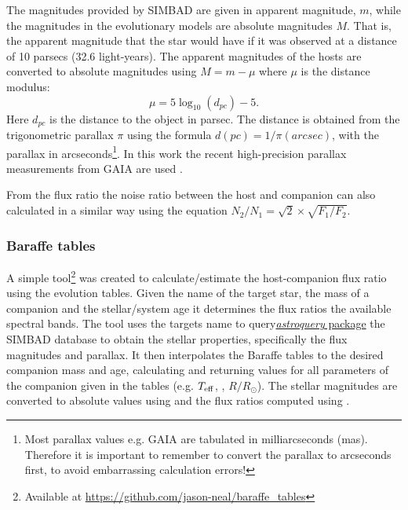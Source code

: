 The magnitudes provided by {SIMBAD} are given in apparent magnitude, $m$, while the magnitudes in the evolutionary models are absolute magnitudes $M$. That is, the apparent magnitude that the star would have if it was observed at a distance of 10 parsecs (32.6 light-years). The apparent magnitudes of the hosts are converted to absolute magnitudes using \(M = m - \mu\) where \(\mu\) is the distance modulus:
\begin{equation}
\mu = 5 \log_{10}(d_{pc}) -5. \label{eqn:distance_modulus}
\end{equation}
Here $d_{pc}$ is the distance to the object in parsec. The distance is obtained from the trigonometric parallax  $\pi$ using the formula $d(pc) = 1 /\pi(arcsec)$, with the parallax in arcseconds\footnote{Most parallax values e.g. GAIA are tabulated in milliarcseconds (mas). Therefore it is important to remember to convert the parallax to arcseconds first, to avoid embarrassing calculation errors!}. In this work the recent high-precision parallax measurements from GAIA are used  \citet{collaboration_gaia_2018}.

From the flux ratio the noise ratio between the host and companion can also calculated in a similar way using the equation \(N_{2}/N_{1} = \sqrt{2} \times\sqrt{F_{1}/F_{2}}\).


\subsubsection{Baraffe tables}
\label{subsubsec:baraffe_tables_code}
A simple tool\footnote{Available at \url{https://github.com/jason-neal/baraffe_tables}} was created to calculate/estimate the host-companion flux ratio using the \citet{baraffe_evolutionary_2003,baraffe_new_2015} evolution tables.
Given the name of the target star, the mass of a companion and the stellar/system age it determines the flux ratios the available spectral bands.
The tool uses the targets name  to query\href{https://zenodo.org/record/1160627}{\emph{astroquery} package} the {SIMBAD} database to obtain the stellar properties, specifically the flux magnitudes and parallax. It then interpolates the Baraffe tables to the desired companion mass and age, calculating and returning values for all parameters of the companion given in the tables (e.g. \(T_{\mathrm{eff}}\), \logg, \(R/R_{\odot}\)).
The stellar magnitudes are converted to absolute values using  and the flux ratios computed using  .


